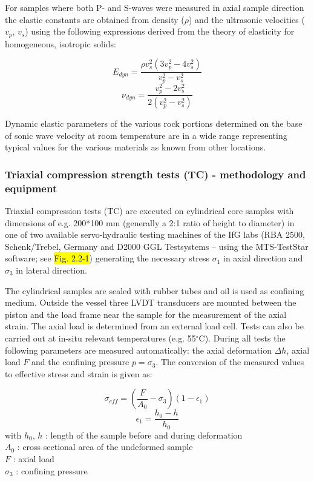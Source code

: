For samples where both P- and S-waves were measured in axial sample direction the elastic constants are obtained from density ($\rho$) and the ultrasonic velocities ($v_p$, $v_s$) using the following expressions derived from the theory of elasticity for homogeneous, isotropic solids:

\begin{equation}
\label{eq:YoungsModulus_Ultrasonic}
E_{dyn} = \frac{\rho v_s^2(3v_p^2-4v_s^2)}{v_p^2-v_s^2} 
\end{equation}
\begin{equation}
\label{eq:PoissonsRatio_Ultrasonic}
\nu_{dyn} = \frac{v_p^2-2v_s^2}{2(v_p^2-v_s^2)}
\end{equation}

Dynamic elastic parameters of the various rock portions determined on the base of sonic wave velocity at room temperature are in a wide range representing typical values for the various materials as known from other locations. 

\subsubsection{Triaxial compression strength tests (TC) - methodology and equipment}

Triaxial compression tests (TC) are executed on cylindrical core samples with dimensions of e.g. 200*100 mm (generally a 2:1 ratio of height to diameter) in one of two available servo-hydraulic testing machines of the IfG labs (RBA 2500, Schenk/Trebel, Germany and D2000 GGL Testsystems – using the MTS-TestStar software; see \hl{Fig. 2.2-1}) generating the necessary stress $\sigma_1$ in axial direction and $\sigma_3$ in lateral direction.

The cylindrical samples are sealed with rubber tubes and oil is used as confining medium. Outside the vessel three LVDT transducers are mounted between the piston and the load frame near the sample for the measurement of the axial strain. The axial load is determined from an external load cell. Tests can also be carried out 
at in-situ relevant temperatures (e.g. 55$^\circ$C). During all tests the following parameters are measured 
automatically: the axial deformation $\Delta h$, axial load $F$ and the confining pressure $p = \sigma_3$. The conversion of the measured values to effective stress and strain is given as:

\begin{equation}
\sigma_{eff} = \left(  \frac{F}{A_0}-\sigma_3 \right) (1-\epsilon_1)
\end{equation}
\begin{equation}
\epsilon_1 = \frac{h_0-h}{h_0}
\end{equation}
with
$h_0$, $h$ : length of the sample before and during deformation \\
$A_0$ : cross sectional area of the undeformed sample \\
$F$ : axial load  \\
$\sigma_3$ : confining pressure 

